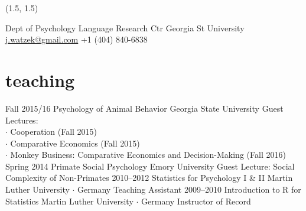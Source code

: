 \documentclass[]{friggeri-cv}
\begin{document}
\renewenvironment{aside}{%
  \let\oldsection\section
  \renewcommand{\section}[1]{
    \par\vspace{\baselineskip}{\Large\headingfont\color{headercolor} ##1}
  }
  \begin{textblock}{3.6}(1.5, 1.5)
  \begin{flushright}
  \obeycr
}{%
  \restorecr
  \end{flushright}
  \end{textblock}
  \let\section\oldsection
}


\begin{aside}
  \section{{\normalfont julia}watzek}
    Dept of Psychology
    Language Research Ctr
    Georgia St University
    ~
    \href{mailto:j.watzek@gmail.com}{j.watzek@gmail.com}
    +1 (404) 840-6838
\end{aside}


\section{teaching}

\begin{entrylist}
  \entry
    {Fall 2015/16}
    {Psychology of Animal Behavior}
    {Georgia State University}
    {Guest Lectures:\\ 
    $\cdot$ Cooperation (Fall 2015)\\
    $\cdot$ Comparative Economics (Fall 2015)\\
    $\cdot$ Monkey Business: Comparative Economics and Decision-Making (Fall 2016)}
  \entry
    {Spring 2014}
    {Primate Social Psychology}
    {Emory University}
    {Guest Lecture: Social Complexity of Non-Primates}
  \entry
    {2010--2012}
    {Statistics for Psychology I \& II}
    {Martin Luther University $\cdot$ Germany}
    {Teaching Assistant}
  \entry
    {2009--2010}
    {Introduction to R for Statistics}
    {Martin Luther University $\cdot$ Germany}
    {Instructor of Record}
\end{entrylist}
\end{document}
